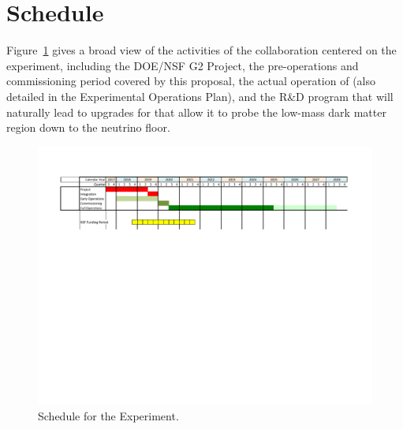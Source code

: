 
\section{Schedule}
\label{sec:schedule}

Figure~\ref{fig:ops-schedule} gives a broad view of the activities of the \SuperCDMS collaboration  centered on the \scs experiment, including the DOE/NSF G2 Project, the pre-operations and commissioning period covered by this proposal, the actual operation of \scs (also detailed in the Experimental Operations Plan), and the R\&D program that will naturally lead to upgrades for \scs that allow it to probe the low-mass dark matter region down to the neutrino floor.



\begin{figure}[htb]
\begin{center}
  \includegraphics[width=\textwidth]{Figures/OpsSched-rac.pdf}
\end{center}
\caption{Schedule for the \scs Experiment.}
\label{fig:ops-schedule}
\end{figure}

